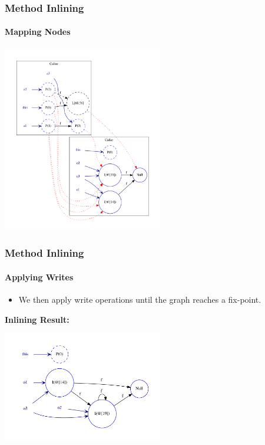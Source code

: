 \documentclass[hyperref={pdfpagelabels=false}]{beamer}
\begin{document}
\begin{frame}[fragile]
    \frametitle{Method Inlining}
    \framesubtitle{Mapping Nodes}

    \begin{center}
        \includegraphics[width=70mm]{images/pt_map1.pdf}
    \end{center}
\end{frame}

\begin{frame}[fragile]
    \frametitle{Method Inlining}
    \framesubtitle{Applying Writes}

    \begin{itemize}
        \item We then apply write operations until the graph reaches a
        fix-point.
    \end{itemize}

    \vspace{15pt}
    \textbf{Inlining Result:}
    \begin{center}
        \includegraphics[width=70mm]{images/pt_inline1result.pdf}
    \end{center}
\end{frame}
\end{document}
